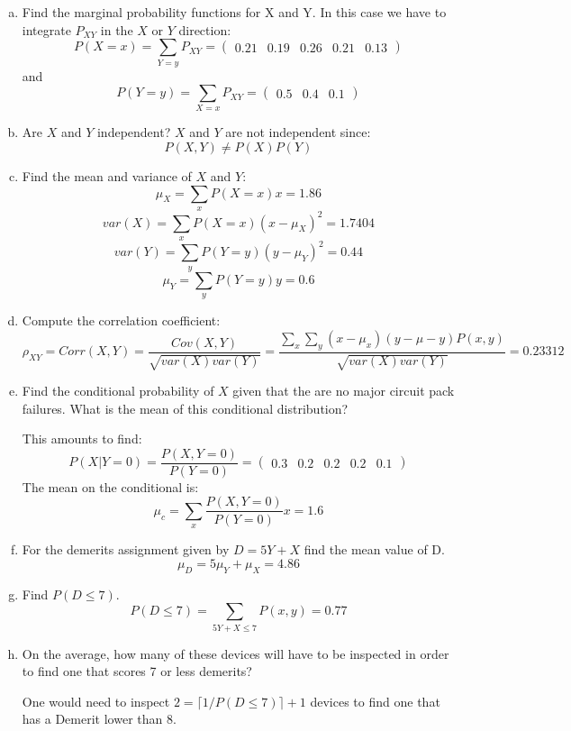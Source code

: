\documentclass[10pt]{article}
\begin{document}
\begin{enumerate}[a.]
  \item Find the marginal probability functions for X and Y. 
        In this case we have to integrate $P_{XY}$ in the $X$ or $Y$
        direction:
        \[
        P(X=x) = \sum_{Y=y} P_{XY} = \begin{pmatrix} 0.21 & 0.19 & 0.26 & 0.21 & 0.13 \end{pmatrix} 
       \]
       and 
        \[
        P(Y=y) = \sum_{X=x} P_{XY} = \begin{pmatrix} 0.5 & 0.4 & 0.1\end{pmatrix} 
       \]

  \item Are $X$ and $Y$ independent? $X$ and $Y$ are not independent since:
      \[
        P(X,Y) \neq P(X) P (Y) 
      \]

  \item Find the mean and variance of $X$ and $Y$:
        \[  
        \mu_X = \sum_{x} P(X=x)x  = 1.86
        \] 
        \[
        var(X) = \sum_{x} P(X=x) (x-\mu_X)^2 = 1.7404
        \]
        \[
        var(Y) = \sum_{y} P(Y=y) (y-\mu_Y)^2 = 0.44 
        \]
        \[  
        \mu_Y = \sum_{y} P(Y=y)y  = 0.6
        \] 

    \item Compute the correlation coefficient:
        \[
        \rho_{XY}  = Corr(X,Y) = \frac{Cov(X,Y)}{\sqrt{var(X)var(Y)}} = \frac{\sum_x \sum_y (x-\mu_x)(y-\mu-y)P(x,y)}{\sqrt{var(X)var(Y)}} = 0.23312
        \]

    \item Find the conditional probability of $X$ given that the are no major circuit pack failures. What is the mean of this 
          conditional distribution?

          This amounts to find: 
         \[P(X | Y=0) = \frac{P(X,Y=0)}{P(Y=0)} = \begin{pmatrix} 0.3 & 0.2 & 0.2 & 0.2 & 0.1 \end{pmatrix}\] 
          The mean on the conditional is:
          \[\mu_c = \sum_{x} \frac{P(X,Y=0)}{P(Y=0)}x = 1.6 \]

    \item For the demerits assignment given by $D = 5Y+X$ find the mean value of D.
         \[
          \mu_D = 5\mu_Y +\mu_X = 4.86
          \]
    \item Find $P(D \leq 7)$. 
          \[
          P(D \leq 7) = \sum_{5Y + X \leq 7} P(x,y) = 0.77
          \]
    \item On the average, how many of these devices will have to be inspected in order to find 
          one that scores 7 or less demerits? 
    
          One would need to inspect $2 = \lceil1/P(D\leq7)\rceil+1 $ devices to find one that has a Demerit lower than 8.
         
\end{enumerate}
\end{document}
